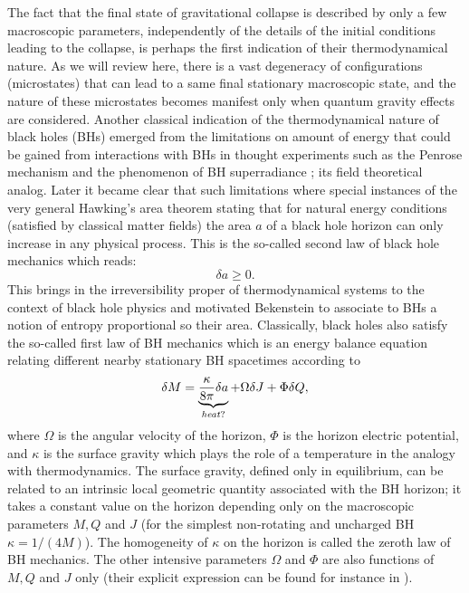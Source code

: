 \documentclass[aps, nofootinbib,superscriptaddress,12pt]{revtex4-2}
\def\be{\begin{equation}}
\def\ee{\end{equation}}
\begin{document}
The fact that the final state of gravitational collapse is described by only a few macroscopic parameters, independently of the details of the initial conditions leading to the collapse, is perhaps the first indication of their thermodynamical nature.   As we will review here, there is a vast degeneracy of configurations (microstates) that can lead to a same final stationary macroscopic state, and the nature of these microstates becomes manifest only when quantum gravity effects are considered. 
Another classical indication of the thermodynamical nature of black holes (BHs) emerged from the limitations on amount of energy that could be gained from interactions with BHs in thought experiments such as the Penrose mechanism \cite{Penrose:1971uk} and the phenomenon of BH superradiance \cite{Starobinsky:1973aij}; its field theoretical analog. Later it became clear that such limitations where special instances of the very general Hawking's area theorem \cite{Hawking:1971tu} stating that for natural energy conditions (satisfied by classical matter fields) the area $a$ of a black hole horizon can only increase in any physical process. This is the so-called second law of black hole mechanics which reads:
\be\label{2nd}
\delta  a\ge 0.
\ee
This brings in the irreversibility proper of thermodynamical systems to the context of black hole physics and motivated Bekenstein \cite{Bekenstein:1973ur, Bekenstein:1972tm}
to associate to BHs a notion of entropy proportional so their area.
Classically, black holes also satisfy the so-called first law of BH mechanics \cite{Bardeen:1973gs} which is an energy balance equation
relating different nearby stationary BH spacetimes according to
%
\begin{eqnarray}\label{1st}
\delta M=\underbrace{\frac{\kappa}{8\pi} \delta a }_{\it heat?}+\Omega \delta J+\Phi  \delta Q,
\end{eqnarray}
%
where $\Omega$ is the angular velocity of the horizon, $\Phi$ is the horizon electric potential, and $\kappa$ is the surface gravity which plays the role 
of a temperature in the analogy with thermodynamics. The surface gravity, defined only in equilibrium,  can be related to an intrinsic local geometric quantity associated with the BH horizon; it takes a constant value on the horizon  depending only on the macroscopic parameters $M, Q$ and $J$
(for the simplest non-rotating and uncharged BH $\kappa=1/(4M)$). The homogeneity of $\kappa$ on the horizon is
called the zeroth law of BH mechanics. The other intensive parameters $\Omega$ and $\Phi$ are also functions of $M, Q$ and $J$ only (their explicit expression can be found for instance in \cite{wald}).
\end{document}
